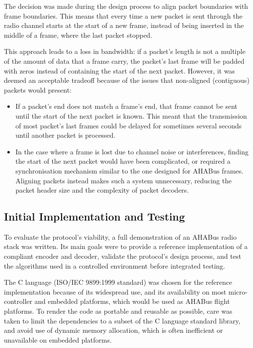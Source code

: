 
The decision was made during the design process to align packet boundaries with
frame boundaries. This means that every time a new packet is sent through the
radio channel starts at the start of a new frame, instead of being inserted
in the middle of a frame, where the last packet stopped.

This approach leads to a loss in bandwidth: if a packet's length is not a 
multiple of the amount of data that a frame carry, the packet's last frame
will be padded with zeros instead of containing the start of the next packet.
However, it was deemed an acceptable tradeoff because of the issues that
non-aligned (contiguous) packets would present:

\begin{itemize}
\item If a packet's end does not match a frame's end, that frame cannot be
sent until the start of the next packet is known. This meant that the
transmission of most packet's last frames could be delayed for sometimes several
seconds until another packet is processed.

\item In the case where a frame is lost due to channel noise or interferences,
finding the start of the next packet would have been complicated, or required
a synchronisation mechanism similar to the one designed for AHABus frames.
Aligning packets instead makes such a system unnecessary, reducing the packet
header size and the complexity of packet decoders.
\end{itemize}


\subsection{Initial Implementation and Testing}

To evaluate the protocol's viability, a full demonstration of an AHABus radio
stack was written. Its main goals were to provide a reference implementation of
a compliant encoder and decoder, validate the protocol's design process, and
test the algorithms used in a controlled environment before integrated testing.

The C language (ISO/IEC 9899:1999 standard) was chosen for the reference
implementation because of its widespread use, and its availability on most
micro-controller and embedded platforms, which would be used as AHABus flight
platforms. To render the code as portable and reusable as possible, care was
taken to limit the dependencies to a subset of the C language standard library,
and avoid use of dynamic memory allocation, which is often inefficient or
unavailable on embedded platforms.

